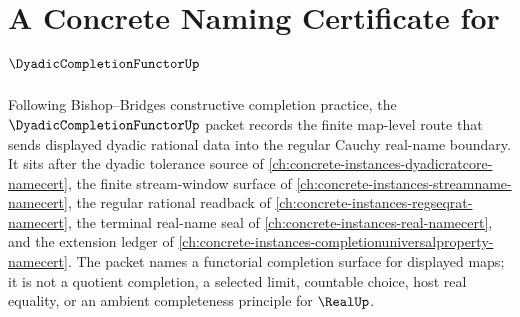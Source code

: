 \chapter{A Concrete Naming Certificate for $\DyadicCompletionFunctorUp$}
\label{ch:concrete-instances-dyadic-completion-functor-namecert}

Following Bishop--Bridges constructive completion practice, the $\DyadicCompletionFunctorUp$ packet records the finite map-level route that sends displayed dyadic rational data into the regular Cauchy real-name boundary. It sits after the dyadic tolerance source of \autoref{ch:concrete-instances-dyadicratcore-namecert}, the finite stream-window surface of \autoref{ch:concrete-instances-streamname-namecert}, the regular rational readback of \autoref{ch:concrete-instances-regseqrat-namecert}, the terminal real-name seal of \autoref{ch:concrete-instances-real-namecert}, and the extension ledger of \autoref{ch:concrete-instances-completionuniversalproperty-namecert}. The packet names a functorial completion surface for displayed maps; it is not a quotient completion, a selected limit, countable choice, host real equality, or an ambient completeness principle for $\RealUp$.

